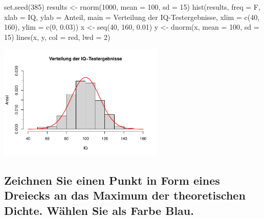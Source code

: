 \documentclass[12pt,a4paper]{article}
\newenvironment{Shaded}{\begin{snugshade}}{\end{snugshade}}
\newcommand{\AttributeTok}[1]{\textcolor[rgb]{0.77,0.63,0.00}{#1}}
\newcommand{\DecValTok}[1]{\textcolor[rgb]{0.00,0.00,0.81}{#1}}
\newcommand{\FloatTok}[1]{\textcolor[rgb]{0.00,0.00,0.81}{#1}}
\newcommand{\FunctionTok}[1]{\textcolor[rgb]{0.00,0.00,0.00}{#1}}
\newcommand{\NormalTok}[1]{#1}
\newcommand{\OtherTok}[1]{\textcolor[rgb]{0.56,0.35,0.01}{#1}}
\newcommand{\StringTok}[1]{\textcolor[rgb]{0.31,0.60,0.02}{#1}}
\begin{document}
\begin{Shaded}
\begin{Highlighting}[]
    \FunctionTok{set.seed}\NormalTok{(}\DecValTok{385}\NormalTok{)}
\NormalTok{    results }\OtherTok{\textless{}{-}} \FunctionTok{rnorm}\NormalTok{(}\DecValTok{1000}\NormalTok{, }\AttributeTok{mean =} \DecValTok{100}\NormalTok{, }\AttributeTok{sd =} \DecValTok{15}\NormalTok{)}
    \FunctionTok{hist}\NormalTok{(results, }\AttributeTok{freq =}\NormalTok{ F, }\AttributeTok{xlab =} \StringTok{\textquotesingle{}IQ\textquotesingle{}}\NormalTok{, }\AttributeTok{ylab =} \StringTok{\textquotesingle{}Anteil\textquotesingle{}}\NormalTok{, }
         \AttributeTok{main =} \StringTok{\textquotesingle{}Verteilung der IQ{-}Testergebnisse\textquotesingle{}}\NormalTok{,}
         \AttributeTok{xlim =} \FunctionTok{c}\NormalTok{(}\DecValTok{40}\NormalTok{, }\DecValTok{160}\NormalTok{), }\AttributeTok{ylim =} \FunctionTok{c}\NormalTok{(}\DecValTok{0}\NormalTok{, }\FloatTok{0.03}\NormalTok{))}
\NormalTok{    x }\OtherTok{\textless{}{-}} \FunctionTok{seq}\NormalTok{(}\DecValTok{40}\NormalTok{, }\DecValTok{160}\NormalTok{, }\FloatTok{0.01}\NormalTok{)}
\NormalTok{    y }\OtherTok{\textless{}{-}} \FunctionTok{dnorm}\NormalTok{(x, }\AttributeTok{mean =} \DecValTok{100}\NormalTok{, }\AttributeTok{sd =} \DecValTok{15}\NormalTok{)}
    \FunctionTok{lines}\NormalTok{(x, y, }\AttributeTok{col =} \StringTok{\textquotesingle{}red\textquotesingle{}}\NormalTok{, }\AttributeTok{lwd =} \DecValTok{2}\NormalTok{)}
\end{Highlighting}
\end{Shaded}

\begin{center}\includegraphics[width=300px]{solution_3_files/figure-latex/unnamed-chunk-13-1} \end{center}

\hypertarget{zeichnen-sie-einen-punkt-in-form-eines-dreiecks-an-das-maximum-der-theoretischen-dichte.-wuxe4hlen-sie-als-farbe-blau.}{%
\subsection{Zeichnen Sie einen Punkt in Form eines Dreiecks an das
Maximum der theoretischen Dichte. Wählen Sie als Farbe
Blau.}\label{zeichnen-sie-einen-punkt-in-form-eines-dreiecks-an-das-maximum-der-theoretischen-dichte.-wuxe4hlen-sie-als-farbe-blau.}}
\end{document}
